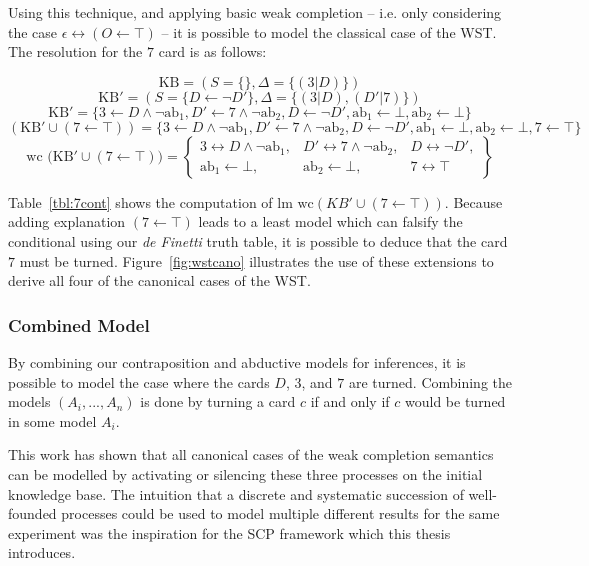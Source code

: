 Using this technique, and applying basic weak completion -- i.e. only considering the case $\epsilon\leftrightarrow(O\leftarrow \top)$ -- it is possible to model the classical case of the WST. The resolution for the $7$ card is as follows:

\[
\text{KB} = (S=\{\},\Delta=\{(3|D)\})
\]
\[
\text{KB}' = (S=\{D \leftarrow  \lnot D'\},\Delta=\{(3|D),(D'|7)\})
\]
\[
\text{KB}' = \{3 \leftarrow D \land \lnot \text{ab}_1, D' \leftarrow 7 \land \lnot \text{ab}_2, D \leftarrow \lnot D', \text{ab}_1 \leftarrow \bot, \text{ab}_2 \leftarrow \bot\}
\]
\[
(\text{KB}'\cup (7\leftarrow\top)) = \{3 \leftarrow D \land \lnot \text{ab}_1, D' \leftarrow 7 \land \lnot \text{ab}_2, D \leftarrow \lnot D', \text{ab}_1 \leftarrow \bot, \text{ab}_2 \leftarrow \bot, 7 \leftarrow \top\}
\]
\begin{equation}
\text{wc (KB}' \cup (7\leftarrow\top)) = \left\lbrace
\begin{matrix}
3 \leftrightarrow D \land \lnot \text{ab}_1, & D' \leftrightarrow 7 \land \lnot \text{ab}_2,& D \leftrightarrow \lnot D',\\
 \text{ab}_1 \leftarrow \bot,& \text{ab}_2 \leftarrow \bot,& 7 \leftrightarrow \top
\end{matrix}
\right\rbrace
\end{equation}

Table~\ref{tbl:7cont} shows the computation of $\textrm{lm wc} (KB'\cup (7\leftarrow\top))$. Because adding explanation $(7 \leftarrow \top)$ leads to a least model which can falsify the conditional using our \textit{de Finetti} truth table, it is possible to deduce that the card $7$ must be turned. Figure~\ref{fig:wstcano} illustrates the use of these extensions to derive all four of the canonical cases of the WST.

 
\subsubsection*{Combined Model}
By combining our contraposition and abductive models for inferences, it is possible to model the case where the cards $D$, $3$, and $7$ are turned. Combining the models $(A_i,...,A_n)$ is done by turning a card $c$ if and only if $c$ would be turned in some model $A_i$.

This work has shown that all canonical cases of the weak completion semantics can be modelled by activating or silencing these three processes on the initial knowledge base. The intuition that a discrete and systematic succession of well-founded processes could be used to model multiple different results for the same experiment was the inspiration for the SCP framework which this thesis introduces.


